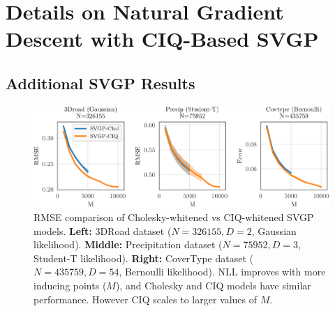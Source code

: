 \chapter{Details on Natural Gradient Descent with CIQ-Based SVGP}

\section{Additional SVGP Results}

\begin{figure}[ht!]
  \centering
  \includegraphics[width=\linewidth]{figures/variational_error.pdf}
  \caption[RMSE comparison of Cholesky-whitened vs CIQ-whitened SVGP models.]{
    RMSE comparison of Cholesky-whitened vs CIQ-whitened SVGP models.
    {\bf Left:} 3DRoad dataset ($N=326155, D=2$, Gaussian likelihood).
    {\bf Middle:} Precipitation dataset ($N=75952, D=3$, Student-T likelihood).
    {\bf Right:} CoverType dataset ($N=435759, D=54$, Bernoulli likelihood).
    NLL improves with more inducing points ($M$), and Cholesky and CIQ models have similar performance.
    However CIQ scales to larger values of $M$.
  }
  \label{fig:variational_error}
\end{figure}
